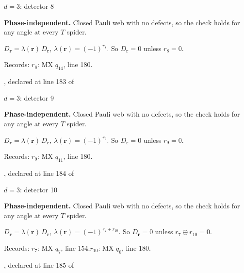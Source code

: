 \label{d3_det008}
{\Large $d=3$: detector 8}\par
\textbf{Phase-independent.} Closed Pauli web with no defects, so the check holds for any angle at every $T$ spider.
\begin{center}
\end{center}
\vspace{-1mm}
$D_{\boldsymbol r}=\lambda(\boldsymbol r)\,D_{\boldsymbol r}$, \quad $\lambda(\boldsymbol r)=(-1)^{r_{8}}$. \qquad So $D_{\boldsymbol r}=0$ unless $r_{8}=0$.
\par\smallskip\begin{minipage}{.98\linewidth}\small Records: $r_{8}$: MX $q_{14}$, line 180.\end{minipage}
\vfill
{\footnotesize\texttt{}, declared at line 183 of \texttt{}}
\newpage

\label{d3_det009}
{\Large $d=3$: detector 9}\par
\textbf{Phase-independent.} Closed Pauli web with no defects, so the check holds for any angle at every $T$ spider.
\begin{center}
\end{center}
\vspace{-1mm}
$D_{\boldsymbol r}=\lambda(\boldsymbol r)\,D_{\boldsymbol r}$, \quad $\lambda(\boldsymbol r)=(-1)^{r_{9}}$. \qquad So $D_{\boldsymbol r}=0$ unless $r_{9}=0$.
\par\smallskip\begin{minipage}{.98\linewidth}\small Records: $r_{9}$: MX $q_{11}$, line 180.\end{minipage}
\vfill
{\footnotesize\texttt{}, declared at line 184 of \texttt{}}
\newpage

\label{d3_det010}
{\Large $d=3$: detector 10}\par
\textbf{Phase-independent.} Closed Pauli web with no defects, so the check holds for any angle at every $T$ spider.
\begin{center}
\end{center}
\vspace{-1mm}
$D_{\boldsymbol r}=\lambda(\boldsymbol r)\,D_{\boldsymbol r}$, \quad $\lambda(\boldsymbol r)=(-1)^{r_{7}+r_{10}}$. \qquad So $D_{\boldsymbol r}=0$ unless $r_{7}\oplus r_{10}=0$.
\par\smallskip\begin{minipage}{.98\linewidth}\small Records: $r_{7}$: MX $q_{7}$, line 154;\quad $r_{10}$: MX $q_{6}$, line 180.\end{minipage}
\vfill
{\footnotesize\texttt{}, declared at line 185 of \texttt{}}
\newpage


